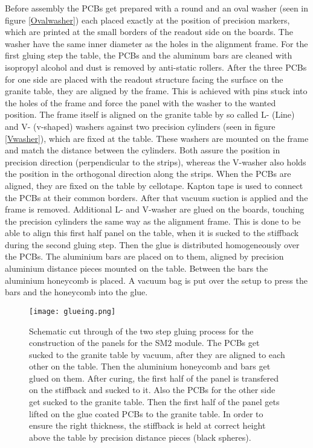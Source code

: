\documentclass[
a4paper,                                %
twoside,                                %
BCOR1.4cm,                      %
10pt,                           %
headings=normal,                %
headsepline,                    %
clearplainpage, %
final,                                  %
div=14,
parskip=full,
openright,
bibliography=toc
]{scrreprt}
\begin{document}
Before assembly the PCBs get prepared with a round and an oval washer (seen in figure \ref{Ovalwasher}) each placed exactly at the position of precision markers, which are printed at the small borders of the readout side on the boards. The washer have the same inner diameter as the holes in the alignment frame. For the first gluing step the table, the PCBs and the aluminum bars are cleaned with isopropyl alcohol and dust is removed by anti-static rollers. After the three PCBs for one side are placed with the readout structure facing the surface on the granite table, they are aligned by the frame. This is achieved with pins stuck into the holes of the frame and force the panel with the washer to the wanted position. The frame itself is aligned on the granite table by so called L- (Line) and V- (v-shaped) washers against two precision cylinders (seen in figure \ref{Vwasher}), which are fixed at the table. These washers are mounted on the frame and match the distance between the cylinders. Both assure the position in precision direction (perpendicular to the strips), whereas the V-washer also holds the position in the orthogonal direction along the strips. 
When the PCBs are aligned, they are fixed on the table by cellotape. Kapton tape is used to connect the PCBs at their common borders. After that vacuum suction is applied and the frame is removed. Additional L- and V-washer are glued on the boards, touching the precision cylinders the same way as the alignment frame. This is done to be able to align this first half panel on the table, when it is sucked to the stiffback during the second gluing step. Then the glue is distributed homogeneously over the PCBs. The aluminium bars are placed on to them, aligned by precision aluminium distance pieces mounted on the table. Between the bars the aluminium honeycomb is placed. A vacuum bag is put over the setup to press the bars and the honeycomb into the glue.

\begin{figure}[H]
	\centering
	\texttt{[image: glueing.png]}
	\caption{Schematic cut through of the two step gluing process for the construction of the panels for the SM2 module. The PCBs get sucked to the granite table by vacuum, after they are aligned to each other on the table. Then the aluminium honeycomb and bars get glued on them. After curing, the first half of the panel is transfered on the stiffback and sucked to it. Also the PCBs for the other side get sucked to the granite table. Then the first half of the panel gets lifted on the glue coated PCBs to the granite table. In order to ensure the right thickness, the stiffback is held at correct height above the table by precision distance pieces (black spheres).}
	\label{twostepglueing}
\end{figure}
\end{document}
